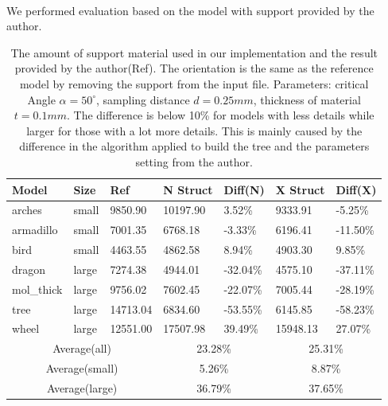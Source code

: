 \documentclass[11pt, a4paper]{article}
\begin{document}
	~\\We performed evaluation based on the model with support provided by the author.
	\begin{table}[ht]
	\centering
	\label{my-label}
	\begin{tabular}{|l|l|l|l|l|l|l|}
		\hline
	Model      & Size  & Ref      & N Struct & Diff(N)   & X Struct  & Diff(X) \\
	\hline
	arches     & small & 9850.90  & 10197.90 & 3.52\%    & 9333.91   & -5.25\%  \\
	\hline
	armadillo  & small & 7001.35  & 6768.18  & -3.33\%    & 6196.41   & -11.50\% \\
	\hline
	bird       & small & 4463.55  & 4862.58  & 8.94\%    & 4903.30   & 9.85\%  \\
	\hline
	dragon     & large & 7274.38  & 4944.01  & -32.04\%   & 4575.10   & -37.11\% \\
	\hline
	mol\_thick & large & 9756.02  & 7602.45  & -22.07\%   & 7005.44   & -28.19\% \\
	\hline
	tree       & large & 14713.04 & 6834.60  & -53.55\%   & 6145.85   & -58.23\% \\
	\hline
	wheel      & large & 12551.00 & 17507.98 & 39.49\%   & 15948.13  & 27.07\% \\
	\hline
	\multicolumn{3}{|c|}{Average(all)} &\multicolumn{2}{|c|}{23.28\%} &\multicolumn{2}{|c|}{25.31\%}\\
	\hline
	\multicolumn{3}{|c|}{Average(small)} &\multicolumn{2}{|c|}{5.26\%} &\multicolumn{2}{|c|}{8.87\%}\\
	\hline
	\multicolumn{3}{|c|}{Average(large)} &\multicolumn{2}{|c|}{36.79\%} &\multicolumn{2}{|c|}{37.65\%}\\
	\hline
	\end{tabular}
	\caption{The amount of support material used in our implementation and the result provided by the author(Ref). The orientation is the same as the reference model by removing the support from the input file. Parameters: critical Angle $\alpha=50^{\circ}$, sampling distance $d=0.25mm$, thickness of material $t=0.1mm$. The difference is below 10\% for models with less details while larger for those with a lot more details. This is mainly caused by the difference in the algorithm applied to build the tree and the parameters setting from the author.}
	\end{table}
\end{document}
